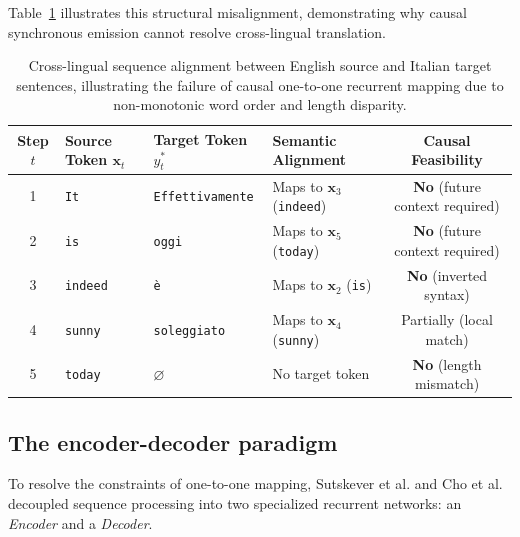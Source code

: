 \documentclass[../../../main.tex]{subfiles}
\begin{document}
Table~\ref{tab:rnn_translation_alignment} illustrates this structural misalignment, demonstrating why causal synchronous emission cannot resolve cross-lingual translation.

\begin{table}[htbp]
\centering
\small
\begin{tabularx}{\textwidth}{c l l X c}
\toprule
\textbf{Step $t$} & \textbf{Source Token $\mathbf{x}_t$} & \textbf{Target Token $y_t^*$} & \textbf{Semantic Alignment} & \textbf{Causal Feasibility} \\
\midrule
1 & \texttt{It} & \texttt{Effettivamente} & Maps to $\mathbf{x}_3$ (\texttt{indeed}) & \textbf{No} (future context required) \\
2 & \texttt{is} & \texttt{oggi} & Maps to $\mathbf{x}_5$ (\texttt{today}) & \textbf{No} (future context required) \\
3 & \texttt{indeed} & \texttt{è} & Maps to $\mathbf{x}_2$ (\texttt{is}) & \textbf{No} (inverted syntax) \\
4 & \texttt{sunny} & \texttt{soleggiato} & Maps to $\mathbf{x}_4$ (\texttt{sunny}) & Partially (local match) \\
5 & \texttt{today} & $\varnothing$ & No target token & \textbf{No} (length mismatch) \\
\bottomrule
\end{tabularx}
\caption{Cross-lingual sequence alignment between English source and Italian target sentences, illustrating the failure of causal one-to-one recurrent mapping due to non-monotonic word order and length disparity.}
\label{tab:rnn_translation_alignment}
\end{table}

\subsection{The encoder-decoder paradigm}
\label{subsec:rnn_encoder_decoder_paradigm}

To resolve the constraints of one-to-one mapping, Sutskever et al. \citep{sutskever2014} and Cho et al. \citep{cho2014} decoupled sequence processing into two specialized recurrent networks: an \textit{Encoder} and a \textit{Decoder}.
\end{document}
